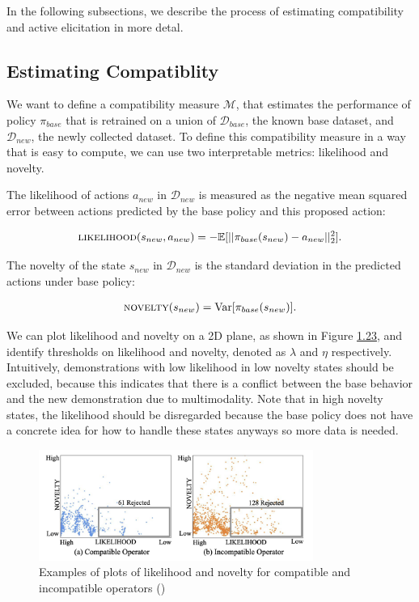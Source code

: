 \documentclass[
  letterpaper,
  DIV=11,
  numbers=noendperiod,
  oneside]{scrreprt}
\theoremstyle{remark}
\begin{document}
In the following subsections, we describe the process of estimating
compatibility and active elicitation in more detal.

\subsection{Estimating Compatiblity}\label{estimating-compatiblity}

We want to define a compatibility measure \(\mathcal{M}\), that
estimates the performance of policy \(\pi_{base}\) that is retrained on
a union of \(\mathcal{D}_{base}\), the known base dataset, and
\(\mathcal{D}_{new}\), the newly collected dataset. To define this
compatibility measure in a way that is easy to compute, we can use two
interpretable metrics: likelihood and novelty.

The likelihood of actions \(a_{new}\) in \(\mathcal{D}_{new}\) is
measured as the negative mean squared error between actions predicted by
the base policy and this proposed action:

\[\begin{aligned}
    \textsc{likelihood}(s_{new}, a_{new}) = -\mathbb{E}[|| \pi_{base}(s_{new}) - a_{new} ||^2_2].
\end{aligned}\]

The novelty of the state \(s_{new}\) in \(\mathcal{D}_{new}\) is the
standard deviation in the predicted actions under base policy:

\[\begin{aligned}
    \textsc{novelty}(s_{new}) = \mathrm{Var}[\pi_{base}(s_{new})].
\end{aligned}\]

We can plot likelihood and novelty on a 2D plane, as shown in Figure
\hyperref[fig:likelihood_novelty]{1.23}, and identify thresholds on
likelihood and novelty, denoted as \(\lambda\) and \(\eta\)
respectively. Intuitively, demonstrations with low likelihood in low
novelty states should be excluded, because this indicates that there is
a conflict between the base behavior and the new demonstration due to
multimodality. Note that in high novelty states, the likelihood should
be disregarded because the base policy does not have a concrete idea for
how to handle these states anyways so more data is needed.

\begin{figure}

{\centering \includegraphics[width=0.8\textwidth,height=\textheight]{Figures/likelihood_novelty.png}

}

\caption{Examples of plots of likelihood and novelty for compatible and
incompatible operators ()}

\end{figure}%
\end{document}
